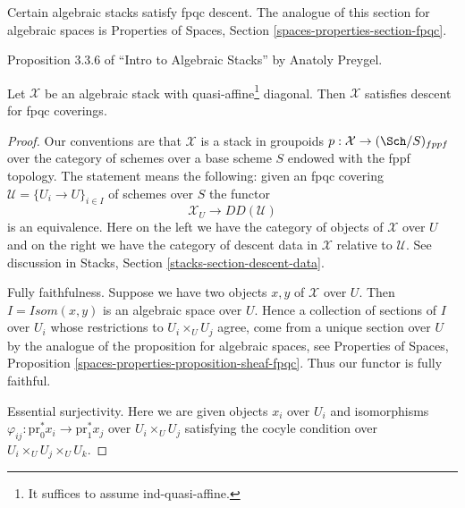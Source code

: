 \noindent
Certain algebraic stacks satisfy fpqc descent.
The analogue of this section for algebraic spaces
is Properties of Spaces, Section \ref{spaces-properties-section-fpqc}.


\begin{proposition}
\label{proposition-stack-fpqc}
\begin{reference}
Proposition 3.3.6 of ``Intro to Algebraic Stacks'' by
Anatoly Preygel.
\end{reference}
Let $\mathcal{X}$ be an algebraic stack with quasi-affine\footnote{It suffices
to assume ind-quasi-affine.} diagonal. Then
$\mathcal{X}$ satisfies descent for fpqc coverings.
\end{proposition}

\begin{proof}
Our conventions are that $\mathcal{X}$ is a stack
in groupoids $p : \mathcal{X} \to (\Sch/S)_{fppf}$
over the category of schemes over a base scheme $S$ endowed
with the fppf topology. The statement means the following:
given an fpqc covering $\mathcal{U} = \{U_i \to U\}_{i \in I}$
of schemes over $S$ the functor
$$
\mathcal{X}_U \longrightarrow DD(\mathcal{U})
$$
is an equivalence. Here on the left we have the category
of objects of $\mathcal{X}$ over $U$ and on the right we have
the category of descent data in $\mathcal{X}$ relative to $\mathcal{U}$.
See discussion in Stacks, Section \ref{stacks-section-descent-data}.

\medskip\noindent
Fully faithfulness. Suppose we have two objects $x, y$ of $\mathcal{X}$
over $U$. Then $I = \mathit{Isom}(x, y)$ is an algebraic space over $U$.
Hence a collection of sections of $I$ over $U_i$ whose restrictions
to $U_i \times_U U_j$ agree, come from a unique section over $U$ by
the analogue of the proposition for algebraic spaces, see
Properties of Spaces, Proposition
\ref{spaces-properties-proposition-sheaf-fpqc}.
Thus our functor is fully faithful.

\medskip\noindent
Essential surjectivity. Here we are given objects
$x_i$ over $U_i$ and isomorphisms
$\varphi_{ij} : \text{pr}_0^*x_i \to \text{pr}_1^*x_j$
over $U_i \times_U U_j$ satisfying the cocyle condition
over $U_i \times_U U_j \times_U U_k$.


\end{proof}
